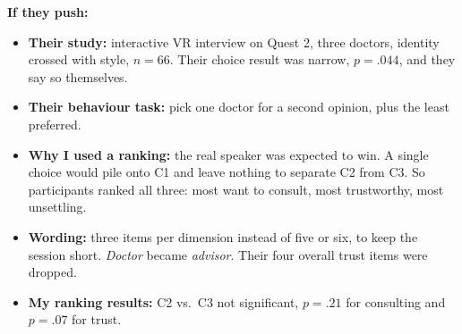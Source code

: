 \documentclass[11pt,a4paper]{article}
\begin{document}
\textbf{If they push:}
\begin{itemize}
  \item \textbf{Their study:} interactive VR interview on Quest 2, three doctors, identity crossed with style, $n=66$. Their choice result was narrow, $p=.044$, and they say so themselves.
  \item \textbf{Their behaviour task:} pick one doctor for a second opinion, plus the least preferred.
  \item \textbf{Why I used a ranking:} the real speaker was expected to win. A single choice would pile onto C1 and leave nothing to separate C2 from C3. So participants ranked all three: most want to consult, most trustworthy, most unsettling.
  \item \textbf{Wording:} three items per dimension instead of five or six, to keep the session short. \emph{Doctor} became \emph{advisor}. Their four overall trust items were dropped.
  \item \textbf{My ranking results:} C2 vs.\ C3 not significant, $p=.21$ for consulting and $p=.07$ for trust.
\end{itemize}
\end{document}
